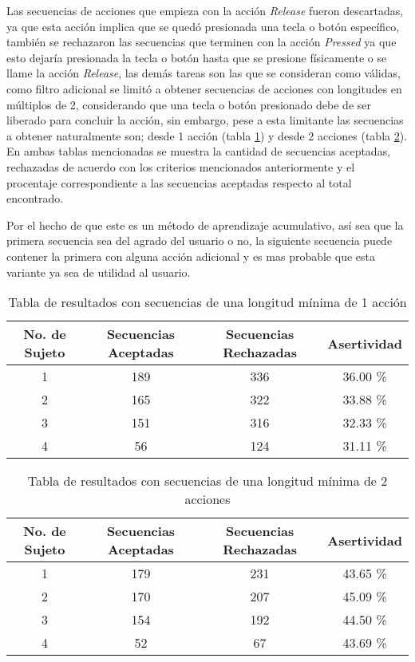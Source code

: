Las secuencias de acciones que empieza con la acci\'on \emph{Release} fueron descartadas, ya que esta acci\'on implica que se qued\'o presionada una tecla o bot\'on espec\'ifico, tambi\'en se rechazaron las secuencias que terminen con la acci\'on \emph{Pressed} ya que esto dejar\'ia presionada la tecla o bot\'on hasta que se presione f\'isicamente o se llame la acci\'on \emph{Release}, las dem\'as tareas son las que se consideran como v\'alidas, como filtro adicional se limit\'o a obtener secuencias de acciones con longitudes en m\'ultiplos de 2, considerando que una tecla o bot\'on presionado debe de ser liberado para concluir la acci\'on, sin embargo, pese a esta limitante las secuencias a obtener naturalmente son; desde 1 acci\'on (tabla \ref{tableRes1}) y desde 2 acciones (tabla \ref{tableRes2}). En ambas tablas mencionadas se muestra la cantidad de secuencias aceptadas, rechazadas de acuerdo con los criterios mencionados anteriormente y el procentaje correspondiente a las secuencias aceptadas respecto al total encontrado.

Por el hecho de que este es un m\'etodo de aprendizaje acumulativo, as\'i sea que la primera secuencia sea del agrado del usuario o no, la siguiente secuencia puede contener la primera con alguna acci\'on adicional y es mas probable que esta variante ya sea de utilidad al usuario. 


\begin{table}[]
\centering
\begin{tabular}{cccc}
\hline
		No. de Sujeto	&	Secuencias Aceptadas	&   Secuencias Rechazadas	&	Asertividad		\\ \hline
		1				&	189						&	336						&	36.00 \%		\\
		2				&	165						&	322						&	33.88 \%		\\
		3				&	151						&	316						&	32.33 \%		\\
		4				&	56						&	124						&	31.11 \%		\\
\hline
\end{tabular}
\caption{Tabla de resultados con secuencias de una longitud m\'inima de 1 acci\'on}
\label{tableRes1}
\end{table}



\begin{table}[]
\centering
\begin{tabular}{cccc}
\hline
		No. de Sujeto	&	Secuencias Aceptadas	&   Secuencias Rechazadas	&	Asertividad		\\ \hline
		1				&	179						&	231						&	43.65 \%		\\
		2				&	170						&	207						&	45.09 \%		\\
		3				&	154						&	192						&	44.50 \%		\\
		4				&	52						&	67						&	43.69 \%		\\
\hline
\end{tabular}
\caption{Tabla de resultados con secuencias de una longitud m\'inima de 2 acciones}
\label{tableRes2}
\end{table}


